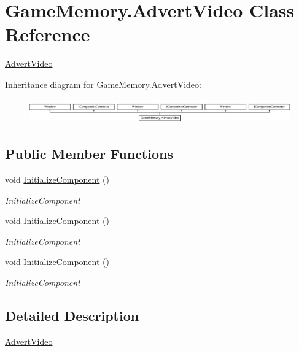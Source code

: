 \hypertarget{class_game_memory_1_1_advert_video}{\section{Game\-Memory.\-Advert\-Video Class Reference}
\label{class_game_memory_1_1_advert_video}
}


\hyperlink{class_game_memory_1_1_advert_video}{Advert\-Video}  


Inheritance diagram for Game\-Memory.\-Advert\-Video\-:\begin{figure}[H]
\begin{center}
\leavevmode
\includegraphics[height=1.078998cm]{class_game_memory_1_1_advert_video}
\end{center}
\end{figure}
\subsection*{Public Member Functions}
\begin{DoxyCompactItemize}
\item 
void \hyperlink{class_game_memory_1_1_advert_video_ac7bf62d252772c82159d8c597ced23f8}{Initialize\-Component} ()
\begin{DoxyCompactList}\small\item\em Initialize\-Component \end{DoxyCompactList}\item 
void \hyperlink{class_game_memory_1_1_advert_video_ac7bf62d252772c82159d8c597ced23f8}{Initialize\-Component} ()
\begin{DoxyCompactList}\small\item\em Initialize\-Component \end{DoxyCompactList}\item 
void \hyperlink{class_game_memory_1_1_advert_video_ac7bf62d252772c82159d8c597ced23f8}{Initialize\-Component} ()
\begin{DoxyCompactList}\small\item\em Initialize\-Component \end{DoxyCompactList}\end{DoxyCompactItemize}


\subsection{Detailed Description}
\hyperlink{class_game_memory_1_1_advert_video}{Advert\-Video} 

